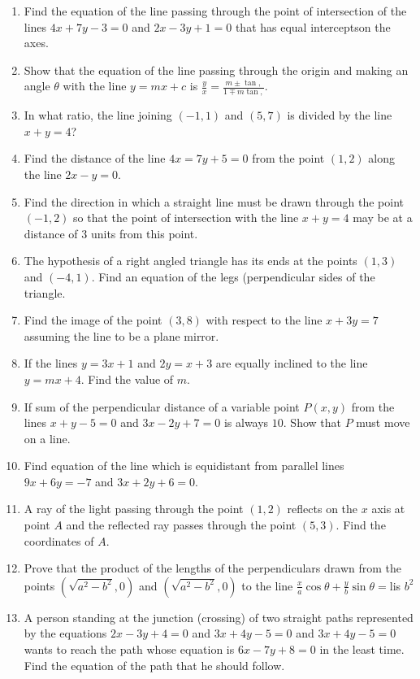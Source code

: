 \documentclass{article}
\theoremstyle{remark}
\begin{document}
\begin{enumerate}
\item Find the equation of the line passing through the point of intersection of the lines $4x+7y-3=0$ and $2x-3y+1=0$ that has equal interceptson the axes.
\item Show that the equation of the line passing through the origin and making an angle $\theta$ with the line $y=mx+c$ is $\frac{y}{x}=\frac{m \pm \tan,}{1 \mp m\tan,}$.
\item In what ratio, the line joining $(-1,1)$ and $(5,7)$ is divided by the line $x+y=4$?
\item Find the distance of the line $4x=7y+5=0$ from the point $(1,2)$ along the line $2x-y=0$.
\item Find the direction in which a straight line must be  drawn through the point $(-1,2)$ so that the point of intersection with the line $x+y=4$ may be at a distance of $3$ units from this point.
\item The hypothesis of a right angled triangle has its ends at the points $(1,3)$ and $(-4,1)$. Find an equation of the legs (perpendicular sides of the triangle.
\item Find the image of the point $(3,8)$ with respect to the line $x+3y=7$ assuming the line to be a plane mirror.
\item If the lines $y= 3x+1$ and $2y= x+3$ are equally inclined to the line $y= mx+4$. Find the value of $m$.
\item If sum of the perpendicular distance of a variable point $P(x,y)$ from the lines $x+y-5=0$ and $3x-2y+7=0$ is always $10$. Show that $P$ must move on a line.
\item Find equation of the line which is equidistant from parallel lines $9x+6y=-7$ and $3x+2y+6=0$.
\item A ray of the light passing through the point $(1,2)$ reflects on the $x$ axis at point $A$ and the reflected ray passes through the point $(5,3)$. Find the coordinates of $A$.
\item Prove that the product of the lengths of the perpendiculars drawn from the points $(\sqrt{a^2-b^2}, 0)$ and $(\sqrt{a^2-b^2}, 0)$ to the line $\frac{x}{a} \cos \theta + \frac{y}{b} \sin \theta = $lis $b^2$
\item A person standing at the junction (crossing) of two straight paths represented by the equations $2x-3y+4=0$ and $3x+4y-5 = 0$ and $3x+4y-5= 0 $ wants to reach the path whose equation is $6x-7y+8=0$ in the least time. Find the equation of the path that he should follow.
\end{enumerate}
\end{document}
